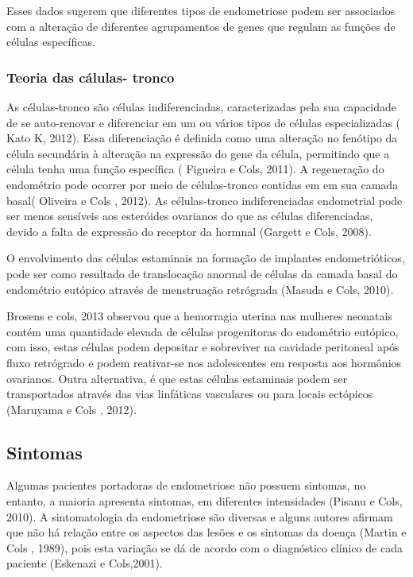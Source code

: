 \documentclass[12pt]{article} %
\begin{document}
Esses dados sugerem que diferentes tipos de endometriose podem ser associados com a alteração de diferentes agrupamentos de genes que regulam as funções de células específicas.
\subsubsection{ Teoria das cálulas- tronco }

As células-tronco são células indiferenciadas, caracterizadas pela sua capacidade de se auto-renovar e diferenciar em um ou vários tipos de células especializadas ( Kato K, 2012). Essa diferenciação é definida como uma alteração no fenótipo da célula secundária à alteração na expressão do gene da célula, permitindo que a célula tenha uma função específica ( Figueira e Cols, 2011). A regeneração do endométrio pode ocorrer por meio de células-tronco contidas em em sua camada basal( Oliveira e Cols , 2012). As células-tronco indiferenciadas endometrial pode ser menos sensíveis aos esteróides ovarianos do que as células diferenciadas, devido a falta de expressão do receptor da hormnal (Gargett e Cols, 2008).

O envolvimento das células estaminais na formação de implantes  endometrióticos, pode ser como resultado de translocação anormal de células da camada basal do endométrio eutópico  através de menstruação retrógrada (Masuda e Cols, 2010).

 Brosens e cols, 2013 observou que a hemorragia uterina nas mulheres neonatais contém uma quantidade elevada de células progenitoras do endométrio eutópico, com isso, estas células podem depositar e sobreviver na cavidade peritoneal após fluxo retrógrado e podem reativar-se nos adolescentes em resposta aos hormônios ovarianos. Outra alternativa, é que estas células estaminais podem ser transportados através das vias linfáticas vasculares ou para locais ectópicos (Maruyama e Cols , 2012).

\subsection{Sintomas} 

Algumas pacientes portadoras de endometriose
não possuem sintomas, no entanto, a maioria apresenta sintomas,
em diferentes intensidades (Pisanu e Cols, 2010). A sintomatologia da endometriose são diversas  e alguns autores afirmam que não há relação entre os aspectos das lesões e os sintomas da doença (Martin e Cols , 1989), pois esta variação  se dá de acordo com o diagnóstico clínico de cada paciente (Eskenazi e Cols,2001).
\end{document}

